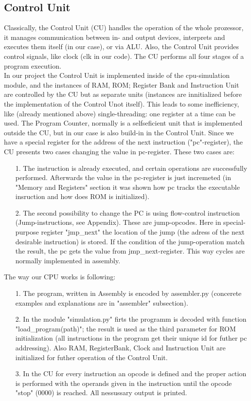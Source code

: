 \documentclass[11pt,a4paper]{article}
\begin{document}
\subsection{Control Unit}
Classically, the Control Unit (CU) handles the operation of the whole prozessor, it manages communication between in- and output devices, interprets and executes them itself (in our case), or via ALU. Also, the Control Unit provides control signals, like clock (clk in our code). The CU performs all four stages of a program execution.\\
In our project the Control Unit is implemented inside of the cpu-simulation module, and the instances of RAM, ROM; Register Bank and Instruction Unit are controlled by the CU but as separate units (instances are innitialized before the implementation of the Control Unot itself). This leads to some inefficiency, like (already mentioned above) single-threading: one register at a time can be used. The Program Counter, normally is a selfseficient unit that is implemented outside the CU, but in our case is also build-in in the Control Unit. Since we have a special register for the address of the next instruction ("pc"-register), the CU presents two cases changing the value in pc-register. These two cases are:
\begin{enumerate}
	\item[1.] The instruction is already executed, and certain operations are successfully performed. Afterwards the value in the pc-register is just incremeted (in "Memory and Registers" section it was shown how pc tracks the executable insruction and how does ROM is initialized). 
	\item[2.] The second possibility to change the PC is using flow-control instruction (Jump-instructions, see Appendix). These are jump-opcodes. Here in special-purpose register "jmp\_next" the location of the jump (the adress of the next desirable instruction) is stored. If the condition of the jump-operation match the result, the pc gets the value from jmp\_next-register. This way cycles are normally implemented in assembly.	
\end{enumerate} 
The way our CPU works is following:
\begin{enumerate}
	\item[1.] The program, written in Assembly is encoded by assembler.py (concerete examples and explanations are in "assembler" subsection).
	\item[2.] In the module "simulation.py" firts the programm is decoded with function "load\_program(path)"; the result is used as the third parameter for ROM initialization (all instructions in the program get their unique id for futher pc addressing). Also RAM, RegisterBank, Clock and Instruction Unit are initialized for futher operation of the Control Unit.
	\item[3.] In the CU for every instruction an opcode is defined and the proper action is performed with the operands given in the instruction until the opcode "stop" (0000) is reached. All nessussary output is printed.  
\end{enumerate}
\end{document}
